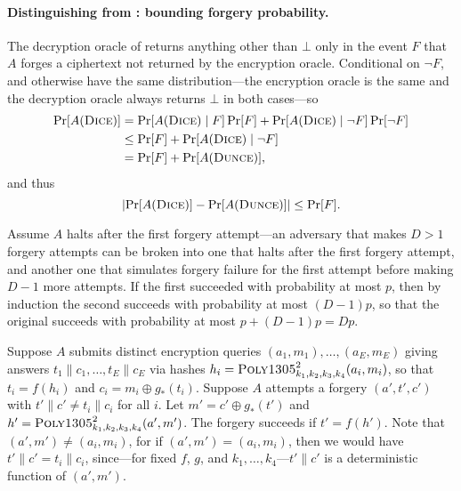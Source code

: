 \documentclass[draft]{article}
\def\operatorsc#1{{%
  \ifmmode\let\next=\operatorname\else\let\next=\relax\fi\next{\textsc{#1}}}}
\def\Poly#1/{\operatorsc{Poly#1}}
\def\DUNCE/{\operatorsc{Dunce}}
\def\DICE/{\operatorsc{Dice}}
\newcommand{\concat}{\mathbin\|}
\newcommand{\given}{\mathrel|}
\begin{document}
\paragraph*{Distinguishing \DICE/ from \DUNCE/: bounding forgery
  probability.}
\leavevmode\hfill\break
The decryption oracle of \DICE/ returns anything other than
 $\bot$ only in the event $F$ that $A$ forges a ciphertext not
 returned by the encryption oracle.
Conditional on $\lnot F$, \DICE/ and \DUNCE/ otherwise have the same
 distribution---the encryption oracle is the same and the decryption
 oracle always returns $\bot$ in both cases---so
%
\begin{align*}
  \Pr[A(\DICE/)]
  &= \Pr[A(\DICE/) \given F] \Pr[F]
     + \Pr[A(\DICE/) \given \lnot F] \Pr[\lnot F] \\
  &\leq \Pr[F] + \Pr[A(\DICE/) \given \lnot F] \\
  &= \Pr[F] + \Pr[A(\DUNCE/)],
\end{align*}
%
 and thus
\[
  \lvert\Pr[A(\DICE/)] - \Pr[A(\DUNCE/)]\rvert
  \leq \Pr[F].
\]

Assume $A$ halts after the first forgery attempt---an adversary that
 makes $D>1$ forgery attempts can be broken into one that halts after
 the first forgery attempt, and another one that simulates forgery
 failure for the first attempt before making $D-1$ more attempts.
If the first succeeded with probability at most $p$, then by induction
 the second succeeds with probability at most $(D - 1) p$, so that the
 original succeeds with probability at most $p + (D - 1) p = D p$.

Suppose $A$ submits distinct encryption queries
 $(a_1, m_1), \dotsc, (a_E, m_E)$
 giving answers
 $t_1 \concat c_1, \dotsc, t_E \concat c_E$
 via hashes
 $h_i = \Poly1305/^2_{k_1,k_2,k_3,k_4}(a_i, m_i)$,
 so that $t_i = f(h_i)$ and $c_i = m_i \oplus g_*(t_i)$.
Suppose $A$ attempts a forgery $(a', t', c')$ with
 $t' \concat c' \ne t_i \concat c_i$ for all $i$.
Let
 $m' = c' \oplus g_*(t')$
 and
 $h' = \Poly1305/^2_{k_1,k_2,k_3,k_4}(a', m')$.
The forgery succeeds if $t' = f(h')$.
Note that $(a', m') \ne (a_i, m_i)$, for if
 $(a', m') = (a_i, m_i)$,
 then we would have
 $t' \concat c' = t_i \concat c_i$, since---for fixed $f$, $g$, and
 $k_1,\dotsc,k_4$---$t' \concat c'$ is a deterministic function of
 $(a', m')$.
\end{document}
